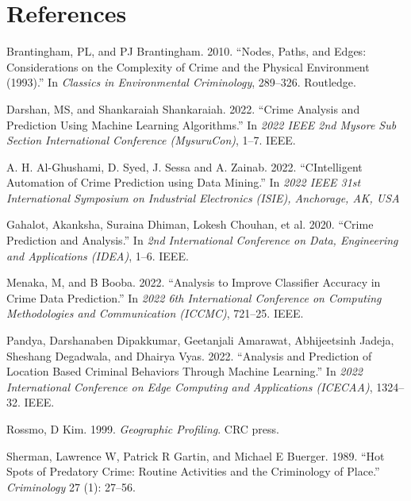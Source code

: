 \documentclass[conference,final,]{IEEEtran}
\newlength{\cslhangindent}
\newenvironment{CSLReferences}[2] %
 {\begin{list}{}{%
  \setlength{\itemindent}{0pt}
  \setlength{\leftmargin}{0pt}
  \setlength{\parsep}{0pt}
  \ifodd #1
   \setlength{\leftmargin}{\cslhangindent}
   \setlength{\itemindent}{-1\cslhangindent}
  \fi
  \setlength{\itemsep}{#2\baselineskip}}}
 {\end{list}}
\begin{document}
\section*{References}\label{references}

\label{refs}
\begin{CSLReferences}{1}{0}
Brantingham, PL, and PJ Brantingham. 2010. {``Nodes, Paths, and Edges:
Considerations on the Complexity of Crime and the Physical Environment
(1993).''} In \emph{Classics in Environmental Criminology}, 289--326.
Routledge.

Darshan, MS, and Shankaraiah Shankaraiah. 2022. {``Crime Analysis and
Prediction Using Machine Learning Algorithms.''} In \emph{2022 IEEE 2nd
Mysore Sub Section International Conference (MysuruCon)}, 1--7. IEEE.


A. H. Al-Ghushami, D. Syed, J. Sessa and A. Zainab. 2022. 
{``CIntelligent Automation of Crime Prediction using Data Mining.''} 
In \emph{2022 IEEE 31st International Symposium on Industrial Electronics (ISIE), Anchorage, AK, USA}

Gahalot, Akanksha, Suraina Dhiman, Lokesh Chouhan, et al. 2020. {``Crime
Prediction and Analysis.''} In \emph{2nd International Conference on
Data, Engineering and Applications (IDEA)}, 1--6. IEEE.

Menaka, M, and B Booba. 2022. {``Analysis to Improve Classifier Accuracy
in Crime Data Prediction.''} In \emph{2022 6th International Conference
on Computing Methodologies and Communication (ICCMC)}, 721--25. IEEE.

Pandya, Darshanaben Dipakkumar, Geetanjali Amarawat, Abhijeetsinh
Jadeja, Sheshang Degadwala, and Dhairya Vyas. 2022. {``Analysis and
Prediction of Location Based Criminal Behaviors Through Machine
Learning.''} In \emph{2022 International Conference on Edge Computing
and Applications (ICECAA)}, 1324--32. IEEE.

Rossmo, D Kim. 1999. \emph{Geographic Profiling}. CRC press.

Sherman, Lawrence W, Patrick R Gartin, and Michael E Buerger. 1989.
{``Hot Spots of Predatory Crime: Routine Activities and the Criminology
of Place.''} \emph{Criminology} 27 (1): 27--56.


\end{CSLReferences}
\end{document}
